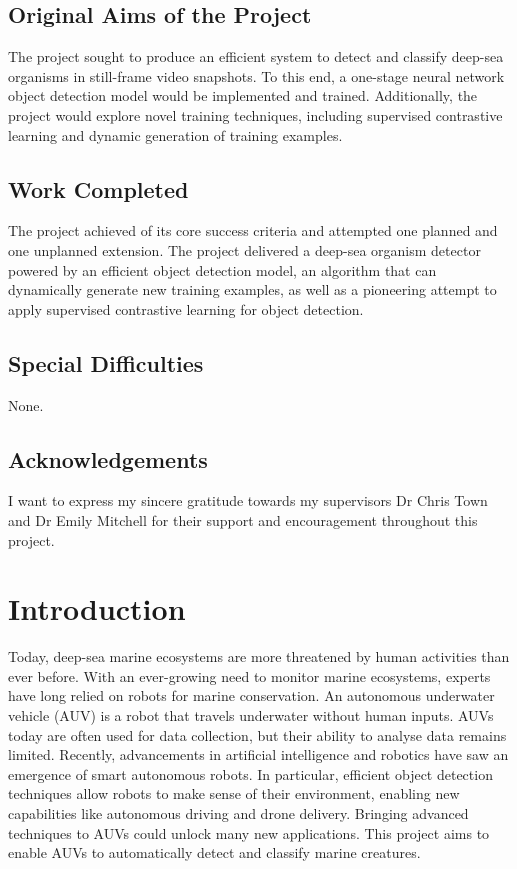 \documentclass[12pt,a4paper,twoside,openany]{report}
\begin{document}
\section*{Original Aims of the Project}
The project sought to produce an efficient system to detect and classify deep-sea organisms in still-frame video snapshots. To this end, a one-stage neural network object detection model would be implemented and trained. Additionally, the project would explore novel training techniques, including supervised contrastive learning and dynamic generation of training examples.

\section*{Work Completed}
The project achieved of its core success criteria and attempted one planned and one unplanned extension. The project delivered a deep-sea organism detector powered by an efficient object detection model, an algorithm that can dynamically generate new training examples, as well as a pioneering attempt to apply supervised contrastive learning for object detection.

\section*{Special Difficulties}
None.

\tableofcontents

\newpage
\section*{Acknowledgements}
I want to express my sincere gratitude towards my supervisors Dr Chris Town and Dr Emily Mitchell for their support and encouragement throughout this project.

\pagestyle{headings}

\chapter{Introduction}

Today, deep-sea marine ecosystems are more threatened by human activities than ever before. With an ever-growing need to monitor marine ecosystems, experts have long relied on robots for marine conservation.
An autonomous underwater vehicle (AUV) is a robot that travels underwater without human inputs. AUVs today are often used for data collection, but their ability to analyse data remains limited.  Recently, advancements in artificial intelligence and robotics have saw an emergence of smart autonomous robots. In particular, efficient object detection techniques allow robots to make sense of their environment, enabling new capabilities like autonomous driving and drone delivery. Bringing advanced techniques to AUVs could unlock many new applications. This project aims to enable AUVs to automatically detect and classify marine creatures.
\end{document}
